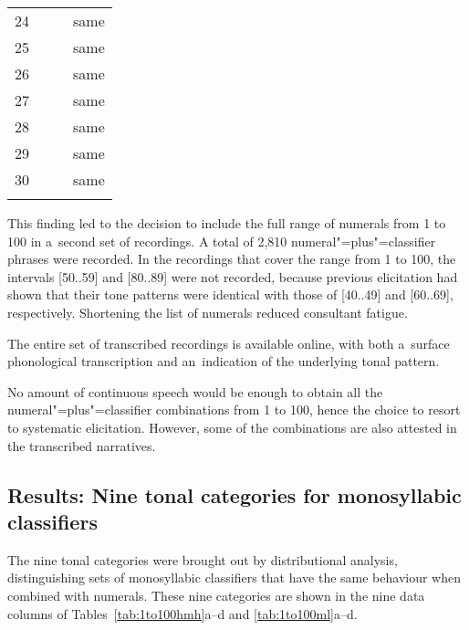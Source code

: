 \begin{table}[p]
\begin{tabularx}{.85\textwidth}{ l Q Q l}
		24 &  &  & same\\
		25 &  &  & same\\
		26 &  &  & same\\
		27 &  &  & same\\
		28 &  &  & same\\
		29 &  &  & same\\
		30 &  &  & same\\
		\lspbottomrule
	\end{tabularx}
	\label{tab:stepsanddays}
\end{table}

This finding led to the decision to include the full range of numerals from 1 to 100 in a~second set of recordings. A total of 2,810 numeral"=plus"=classifier phrases were recorded. In the recordings that cover the range from 1 to 100, the intervals
[50..59] and [80..89] were not recorded, because previous elicitation had shown that their tone
patterns were identical with those of [40..49] and [60..69], respectively. Shortening the list
of numerals reduced consultant fatigue. 

The entire set of transcribed recordings is available online, with both a~surface phonological
transcription and an~indication of the underlying tonal pattern. 

No amount of continuous speech would be enough to obtain all the numeral"=plus"=classifier
combinations from 1 to 100, hence the choice to resort to systematic elicitation. However, some of
the combinations are also attested in the transcribed narratives.

\newpage 
\subsection{Results: Nine tonal categories for monosyllabic classifiers}
\label{sec:results}
\label{sec:howthetonalcategorieswerebroughtoutandlabelled}

The nine tonal categories were brought out by distributional analysis, distinguishing sets of {monosyllabic} classifiers that have the same behaviour when
combined with numerals. These nine categories are shown in the nine
data columns of Tables~\ref{tab:1to100hmh}a--d and \ref{tab:1to100ml}a--d. 

